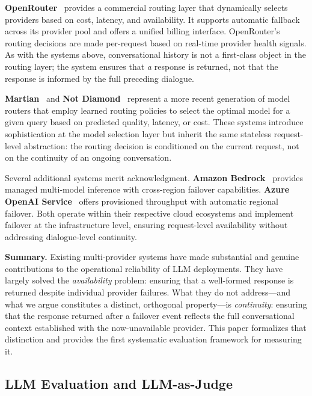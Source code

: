 \textbf{OpenRouter}~\cite{openrouter} provides a commercial routing layer that dynamically selects providers based on cost, latency, and availability. It supports automatic fallback across its provider pool and offers a unified billing interface. OpenRouter's routing decisions are made per-request based on real-time provider health signals. As with the systems above, conversational history is not a first-class object in the routing layer; the system ensures that \textit{a} response is returned, not that the response is informed by the full preceding dialogue.

\textbf{Martian}~\cite{martian} and \textbf{Not Diamond}~\cite{notdiamond} represent a more recent generation of model routers that employ learned routing policies to select the optimal model for a given query based on predicted quality, latency, or cost. These systems introduce sophistication at the model selection layer but inherit the same stateless request-level abstraction: the routing decision is conditioned on the current request, not on the continuity of an ongoing conversation.

Several additional systems merit acknowledgment. \textbf{Amazon Bedrock}~\cite{bedrock} provides managed multi-model inference with cross-region failover capabilities. \textbf{Azure OpenAI Service}~\cite{azure-openai} offers provisioned throughput with automatic regional failover. Both operate within their respective cloud ecosystems and implement failover at the infrastructure level, ensuring request-level availability without addressing dialogue-level continuity.

\textbf{Summary.} Existing multi-provider systems have made substantial and genuine contributions to the operational reliability of LLM deployments. They have largely solved the \textit{availability} problem: ensuring that a well-formed response is returned despite individual provider failures. What they do not address---and what we argue constitutes a distinct, orthogonal property---is \textit{continuity}: ensuring that the response returned after a failover event reflects the full conversational context established with the now-unavailable provider. This paper formalizes that distinction and provides the first systematic evaluation framework for measuring it.

\subsection{LLM Evaluation and LLM-as-Judge}

